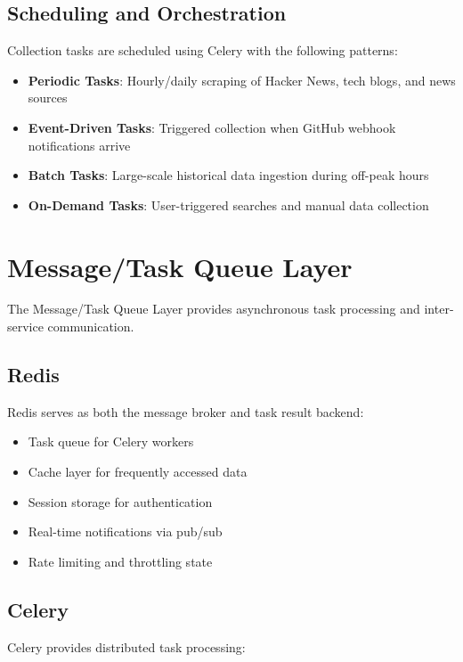 \documentclass[12pt,a4paper]{report}
\begin{document}
\subsection{Scheduling and Orchestration}

Collection tasks are scheduled using Celery with the following patterns:

\begin{itemize}[label=\textbullet]
    \item \textbf{Periodic Tasks}: Hourly/daily scraping of Hacker News, tech blogs, and news sources
    \item \textbf{Event-Driven Tasks}: Triggered collection when GitHub webhook notifications arrive
    \item \textbf{Batch Tasks}: Large-scale historical data ingestion during off-peak hours
    \item \textbf{On-Demand Tasks}: User-triggered searches and manual data collection
\end{itemize}

\section{Message/Task Queue Layer}

The Message/Task Queue Layer provides asynchronous task processing and inter-service communication.

\subsection{Redis}

Redis serves as both the message broker and task result backend:

\begin{itemize}[label=\textbullet]
    \item Task queue for Celery workers
    \item Cache layer for frequently accessed data
    \item Session storage for authentication
    \item Real-time notifications via pub/sub
    \item Rate limiting and throttling state
\end{itemize}

\subsection{Celery}

Celery provides distributed task processing:
\end{document}
